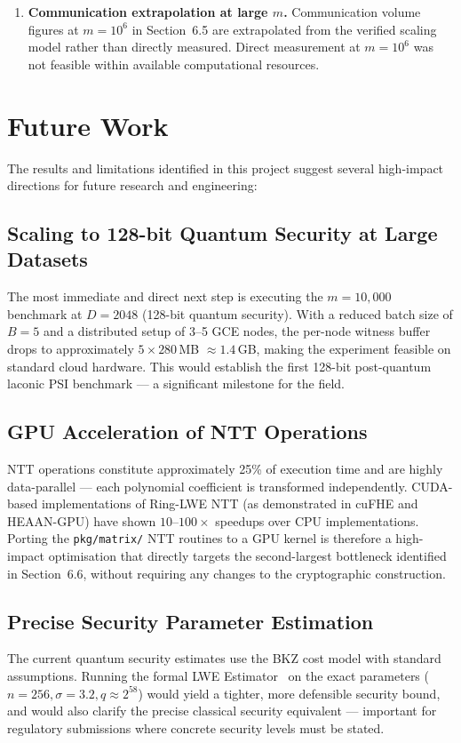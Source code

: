 \begin{enumerate}
    \item \textbf{Communication extrapolation at large $m$.} Communication volume
          figures at $m = 10^6$ in Section~6.5 are extrapolated from the verified
          scaling model rather than directly measured. Direct measurement at
          $m = 10^6$ was not feasible within available computational resources.
\end{enumerate}

\section{Future Work}

The results and limitations identified in this project suggest several high-impact
directions for future research and engineering:

\subsection{Scaling to 128-bit Quantum Security at Large Datasets}
The most immediate and direct next step is executing the $m = 10{,}000$ benchmark
at $D = 2048$ (128-bit quantum security). With a reduced batch size of $B = 5$
and a distributed setup of 3--5 GCE nodes, the per-node witness buffer drops to
approximately $5 \times 280$\,MB $\approx 1.4$\,GB, making the experiment feasible
on standard cloud hardware. This would establish the first 128-bit post-quantum
laconic PSI benchmark --- a significant milestone for the field.

\subsection{GPU Acceleration of NTT Operations}
NTT operations constitute approximately 25\% of execution time and are highly
data-parallel --- each polynomial coefficient is transformed independently. CUDA-based
implementations of Ring-LWE NTT (as demonstrated in cuFHE and HEAAN-GPU) have shown
$10\text{--}100\times$ speedups over CPU implementations. Porting the \texttt{pkg/matrix/}
NTT routines to a GPU kernel is therefore a high-impact optimisation that directly
targets the second-largest bottleneck identified in Section~6.6, without requiring
any changes to the cryptographic construction.

\subsection{Precise Security Parameter Estimation}
The current quantum security estimates use the BKZ cost model with standard assumptions.
Running the formal LWE Estimator~\cite{albrecht2015hardness} on the exact parameters
($n = 256, \sigma = 3.2, q \approx 2^{58}$) would yield a tighter, more defensible
security bound, and would also clarify the precise classical security equivalent ---
important for regulatory submissions where concrete security levels must be stated.

